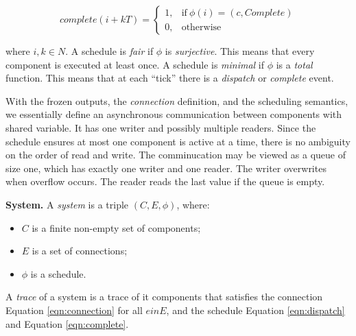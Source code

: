 \begin{equation}
\label{eqn:complete}
    complete(i+kT) =
    \begin{cases}
      1, & \text{if}\ \phi(i) = (c, Complete) \\
      0, & \text{otherwise}
    \end{cases}
\end{equation}

where $i,k\in N$.
A schedule is \emph{fair} if $\phi$ is \emph{surjective}. This means that every component is executed at least once.
A schedule is \emph{minimal} if $\phi$ is a \emph{total} function. This means that at each ``tick'' there is a \emph{dispatch} or \emph{complete} event. 

With the frozen outputs, the \emph{connection} definition, and the scheduling semantics, we essentially define an asynchronous communication between components with shared variable. It has one writer and possibly multiple readers. Since the schedule ensures at most one component is active at a time, there is no ambiguity on the order of read and write. The comminucation may be viewed as a queue of size one, which has exactly one writer and one reader. The writer overwrites when overflow occurs. The reader reads the last value if the queue is empty.

{\bf System.}
A \emph{system} is a triple $(C, E, \phi)$, where:
\begin{itemize}
    	\item $C$ is a finite non-empty set of components;
    	\item $E$ is a set of connections;
    	\item $\phi$ is a schedule.
\end{itemize}
A \emph{trace} of a system is a trace of it components that satisfies the connection Equation \ref{eqn:connection} for all $e in E$, and the schedule Equation \ref{eqn:dispatch} and Equation \ref{eqn:complete}.

